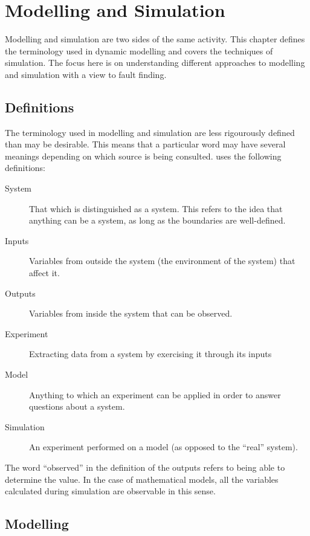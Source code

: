 \chapter{Modelling and Simulation}

\begin{overview}
Modelling and simulation are two sides of the same activity.
This chapter defines the terminology used in dynamic modelling and covers the techniques of simulation.
The focus here is on understanding different approaches to modelling and simulation with a view to fault finding.
\end{overview}

\section{Definitions}
The terminology used in modelling and simulation are less rigourously defined than may be desirable.
This means that a particular word may have several meanings depending on which source is being consulted.
\citet[4--10]{cellier1991continuous} uses the following definitions:  
\begin{description}
\item[System] That which is distinguished as a system.  
This refers to the idea that anything can be a system, as long as the boundaries are well-defined.
\item[Inputs] Variables from outside the system (the environment of the system) that affect it.
\item[Outputs] Variables from inside the system that can be observed.
\item[Experiment] Extracting data from a system by exercising it through its inputs
\item[Model] Anything to which an experiment can be applied in order to answer questions about a system.
\item[Simulation] An experiment performed on a model (as opposed to the ``real'' system).
\end{description}

The word ``observed'' in the definition of the outputs refers to being able to determine the value.  
In the case of mathematical models, all the variables calculated during simulation are observable in this sense.

\section{Modelling}
